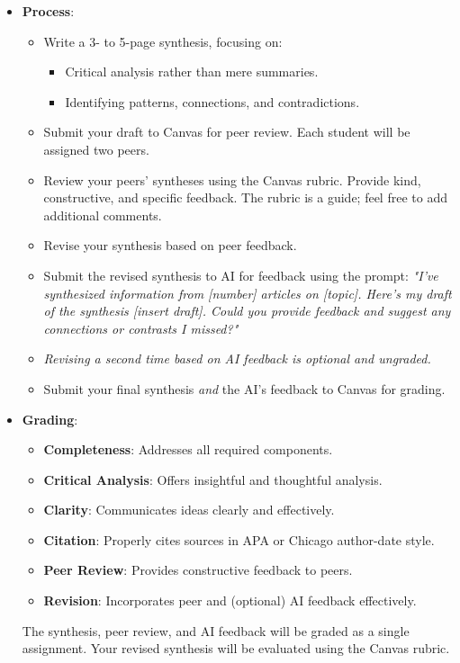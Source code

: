 \documentclass[12pt, letterpaper]{article}
\newenvironment{boldnumlist}
{\begin{enumerate}[label=\textbf{\arabic*.}]}
{\end{enumerate}}
\begin{document}
\begin{boldnumlist}
\begin{itemize}
    \item \textbf{Process}:
    \begin{itemize}
        \item Write a 3- to 5-page synthesis, focusing on:
        \begin{itemize}
            \item Critical analysis rather than mere summaries.
            \item Identifying patterns, connections, and contradictions.
        \end{itemize}
        \item Submit your draft to Canvas for peer review. Each student will be assigned two peers.
        \item Review your peers' syntheses using the Canvas rubric. Provide kind, constructive, and specific feedback. The rubric is a guide; feel free to add additional comments.
        \item Revise your synthesis based on peer feedback.
        \item Submit the revised synthesis to AI for feedback using the prompt:
        \textit{"I've synthesized information from [number] articles on [topic]. Here's my draft of the synthesis [insert draft]. Could you provide feedback and suggest any connections or contrasts I missed?"}
        \item \emph{Revising a second time based on AI feedback is optional and ungraded.}
        \item Submit your final synthesis \emph{and} the AI's feedback to Canvas for grading.
    \end{itemize}
    \item \textbf{Grading}:
    \begin{itemize}
        \item \textbf{Completeness}: Addresses all required components.
        \item \textbf{Critical Analysis}: Offers insightful and thoughtful analysis.
        \item \textbf{Clarity}: Communicates ideas clearly and effectively.
        \item \textbf{Citation}: Properly cites sources in APA or Chicago author-date style.
        \item \textbf{Peer Review}: Provides constructive feedback to peers.
        \item \textbf{Revision}: Incorporates peer and (optional) AI feedback effectively.
    \end{itemize}
    The synthesis, peer review, and AI feedback will be graded as a single assignment. Your revised synthesis will be evaluated using the Canvas rubric.
\end{itemize}


\end{boldnumlist}
\end{document}
